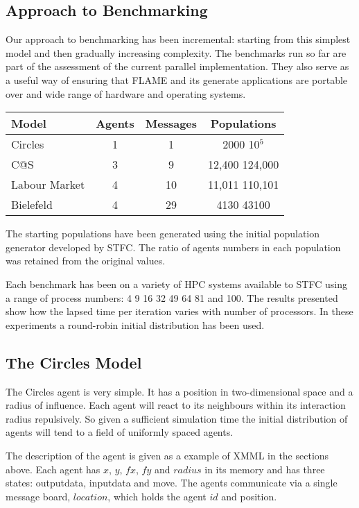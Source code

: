 \subsection{Approach to Benchmarking}
Our approach to benchmarking has been incremental: starting from this simplest model and then gradually increasing complexity. The benchmarks run so far are part of the assessment of the current parallel implementation. They also serve as a useful way of ensuring that FLAME and its generate applications are portable over and wide range of hardware and operating systems. 

\begin{table}[ht]
	\centering
		\begin{tabular}{l|ccc}
		Model 				& Agents & Messages & Populations 		\\\hline
		Circles  			&   1    &   1      &  2000 10$^5$   	\\
		C@S  					&   3    &   9      &  12,400 124,000 \\
		Labour Market &   4    &   10     &  11,011 110,101 \\ 
		Bielefeld	    &   4    &   29     &  4130 43100     \\\hline
		\end{tabular}
\end{table}

The starting populations have been generated using the initial population generator developed by STFC. The ratio of agents numbers in each population was retained from the original values.

Each benchmark has been on a variety of HPC systems available to STFC using a range of process numbers: 4 9 16 32 49 64 81 and 100. The results presented show how the lapsed time per iteration varies with number of processors. In these experiments a round-robin initial distribution has been used.
\subsection{The Circles Model}
The Circles agent is very simple. It has a position in two-dimensional space and a radius of influence. Each agent will react to its neighbours within its interaction radius repulsively. So given a sufficient simulation time the initial distribution of agents will tend to a field of uniformly spaced agents.

The description of the agent is given as a example of XMML in the sections above. Each agent has $x$, $y$, $fx$, $fy$ and $radius$ in its memory and has three states: outputdata, inputdata and move. The agents communicate via a single message board, $location$, which holds the agent $id$ and position.

